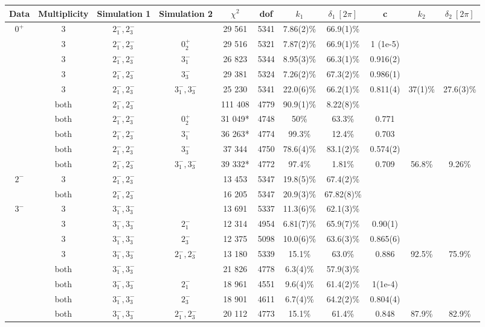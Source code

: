\begin{landscape}
\begin{table}[]
	\begin{tabular}{ccccccccccc}
		Data & Multiplicity & Simulation 1 & Simulation 2 & $\chi^2$ & dof & $k_1$ & $\delta_1\ [2\pi]$ & c & $k_2$ & $\delta_2\ [2\pi]$ \\ \hline
		$0^+$ & 3 & $2^-_1, 2^-_3$ &  & 29 561 & 5341 & 7.86(2)\% & 66.9(1)\% &  &  &  \\
		& 3 & $2^-_1, 2^-_3$ & $0^+_2$ & 29 516 & 5321 & 7.87(2)\% & 66.9(1)\% & 1 (1e-5) &  &  \\
		& 3 & $2^-_1, 2^-_3$ & $3^-_1$ & 26 823 & 5344 & 8.95(3)\% & 66.3(1)\% & 0.916(2) &  &  \\
		& 3 & $2^-_1, 2^-_3$ & $3^-_3$ & 29 381 & 5324 & 7.26(2)\% & 67.3(2)\% & 0.986(1) &  &  \\
		& 3 & $2^-_1, 2^-_3$ & $3^-_1, 3^-_3$ & 25 230 & 5341 & 22.0(6)\% & 66.2(1)\% & 0.811(4) & 37(1)\% & 27.6(3)\% \\
		& both & $2^-_1, 2^-_3$ &  & 111 408 & 4779 & 90.9(1)\% & 8.22(8)\% &  &  &  \\
		& both & $2^-_1, 2^-_3$ & $0^+_2$ & 31 049* & 4748 & 50\% & 63.3\% & 0.771 &  &  \\
		& both & $2^-_1, 2^-_3$ & $3^-_1$ & 36 263* & 4774 & 99.3\% & 12.4\% & 0.703 &  &  \\
		& both & $2^-_1, 2^-_3$ & $3^-_3$ & 37 344 & 4750 & 78.6(4)\% & 83.1(2)\% & 0.574(2) &  &  \\
		& both & $2^-_1, 2^-_3$ & $3^-_1, 3^-_3$ & 39 332* & 4772 & 97.4\% & 1.81\% & 0.709 & 56.8\% & 9.26\% \\ \hline

		$2^-$ & 3 & $2^-_1, 2^-_3$ &  & 13 453 & 5347 & 19.8(5)\% & 67.4(2)\% &  &  &  \\
		& both & $2^-_1, 2^-_3$ &  & 16 205 & 5347 & 20.9(3)\% & 67.82(8)\% &  &  &  \\ \hline

		$3^-$ & 3 & $3^-_1, 3^-_3$ &  & 13 691 & 5337 & 11.3(6)\% & 62.1(3)\% &  &  &  \\
		& 3 & $3^-_1, 3^-_3$ & $2^-_1$ & 12 314 & 4954 & 6.81(7)\% & 65.9(7)\% & 0.90(1) &  &  \\
		& 3 & $3^-_1, 3^-_3$ & $2^-_3$ & 12 375 & 5098 & 10.0(6)\% & 63.6(3)\% & 0.865(6) &  &  \\
		& 3 & $3^-_1, 3^-_3$ & $2^-_1, 2^-_3$ & 13 180 & 5339 & 15.1\% & 63.0\% & 0.886 & 92.5\% & 75.9\% \\
		& both & $3^-_1, 3^-_3$ &  & 21 826 & 4778 & 6.3(4)\% & 57.9(3)\% &  &  &  \\
		& both & $3^-_1, 3^-_3$ & $2^-_1$ & 18 961 & 4551 & 9.6(4)\% & 61.4(2)\% & 1(1e-4) &  &  \\
		& both & $3^-_1, 3^-_3$ & $2^-_3$ & 18 901 & 4611 & 6.7(4)\% & 64.2(2)\% & 0.804(4) &  &  \\
		& both & $3^-_1, 3^-_3$ & $2^-_1, 2^-_3$ & 20 112 & 4773 & 15.1\% & 61.4\% & 0.848 & 87.9\% & 82.9\% \\ \hline


\end{tabular}
\end{table}
\end{landscape}
